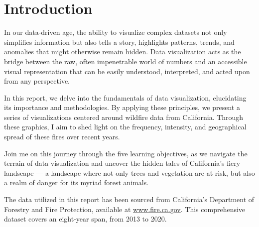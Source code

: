 \chapter{Introduction}
In our data-driven age, the ability to visualize complex datasets not only simplifies information but also tells a story, highlights patterns, trends, and anomalies that might otherwise remain hidden. Data visualization acts as the bridge between the raw, often impenetrable world of numbers and an accessible visual representation that can be easily understood, interpreted, and acted upon from any perspective.

In this report, we delve into the fundamentals of data visualization, elucidating its importance and methodologies. By applying these principles, we present a series of visualizations centered around wildfire data from California. Through these graphics, I aim to shed light on the frequency, intensity, and geographical spread of these fires over recent years.

Join me on this journey through the five learning objectives, as we navigate the terrain of data visualization and uncover the hidden tales of California's fiery landscape --- a landscape where not only trees and vegetation are at risk, but also a realm of danger for its myriad forest animals.

The data utilized in this report has been sourced from California's Department of Forestry and Fire Protection, available at \href{https://fire.ca.gov/}{www.fire.ca.gov}. This comprehensive dataset covers an eight-year span, from 2013 to 2020.
